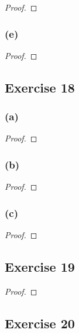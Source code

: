 \documentclass[14pt]{extarticle}
\begin{document}
\begin{proof}

\end{proof}

\subsubsection{(e)}

\begin{proof}

\end{proof}

\subsection{Exercise 18}

\subsubsection{(a)}

\begin{proof}

\end{proof}

\subsubsection{(b)}

\begin{proof}

\end{proof}

\subsubsection{(c)}

\begin{proof}

\end{proof}

\subsection{Exercise 19}

\begin{proof}

\end{proof}

\subsection{Exercise 20}
\end{document}
